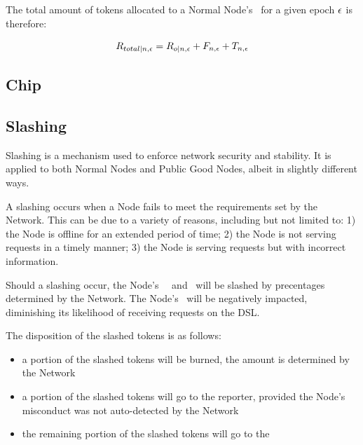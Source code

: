 The total amount of tokens allocated to a Normal Node's \operationPool\ for a given epoch $\epsilon$ is therefore:

\begin{equation}
    R_{total|n, \epsilon} =
    R_{o|n, \epsilon}
    + F_{n, \epsilon}
    + T_{n, \epsilon}
\end{equation}

\subsection{Chip}

\subsection{Slashing}

Slashing is a mechanism used to enforce network security and stability. It is applied to both Normal Nodes and Public Good Nodes, albeit in slightly different ways.

A slashing occurs when a Node fails to meet the requirements set by the Network. This can be due to a variety of reasons, including but not limited to: 1) the Node is offline for an extended period of time; 2) the Node is not serving requests in a timely manner; 3) the Node is serving requests but with incorrect information.

Should a slashing occur, the Node's \deposit\, \stakingPool\, and \networkReward\ will be slashed by precentages determined by the Network.
The Node's \reliabilityScore\ will be negatively impacted, diminishing its likelihood of receiving requests on the \gls{DSL}.

The disposition of the slashed tokens is as follows:
\begin{itemize}
    \item a portion of the slashed tokens will be burned, the amount is determined by the Network
    \item a portion of the slashed tokens will go to the reporter, provided the Node’s misconduct was not auto-detected by the Network
    \item the remaining portion of the slashed tokens will go to the \publicGoodPool
\end{itemize}